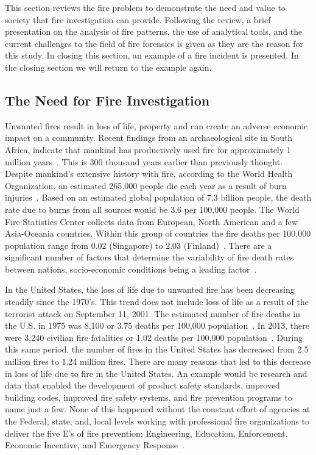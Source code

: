 \documentclass[twoside]{uocthesis}
\begin{document}
This section reviews the fire problem to demonstrate the need and value to society that fire investigation can provide. Following the review, a brief presentation on the analysis  of fire patterns, the use of analytical tools, and the current challenges to the field of fire forensics is given as they are the reason for this study.  In closing this section, an example of a fire incident is presented. In the closing section we will return to the example again.   

\subsection{The Need for Fire Investigation}
Unwanted fires result in loss of life, property and can create an adverse economic impact on a community.  Recent findings from an archaeological site in South Africa, indicate that mankind has productively used fire for approximately 1 million years~\cite{Berna:2012}.  This is 300 thousand years earlier than previously thought.  Despite mankind's extensive history with fire, according to the World Health Organization, an estimated 265,000 people die each year as a result of burn injuries~\cite{WHO:2014}.  Based on an estimated global population of 7.3 billion people, the death rate due to burns from all sources would be 3.6 per 100,000 people.  The World Fire Statistics Center collects data from European, North American and a few Asia-Oceania countries.  Within this group of countries the fire deaths per 100,000 population range from 0.02 (Singapore) to 2.03 (Finland)~\cite{Climate:2014}. There are a significant number of factors that determine the variability of fire death rates between nations, socio-economic conditions being a leading factor~\cite{WHO:2014}.

In the United States, the loss of life due to unwanted fire has been decreasing steadily since the 1970’s.  This trend does not include loss of life as a result of the terrorist attack on September 11, 2001.  The estimated number of fire deaths in the U.S. in 1975 was 8,100 or 3.75 deaths per 100,000 population~\cite{America_Burning_Revisited}.  In 2013, there were 3,240 civilian fire fatalities or 1.02 deaths per 100,000 population~\cite{Karter:2014}.  During this same period, the number of fires in the United States has decreased from 2.5 million fires to 1.24 million fires.  There are many reasons that led to this decrease in loss of life due to fire in the United States.  An example would be research and data that enabled the development of product safety standards, improved building codes, improved fire safety systems, and fire prevention programs to name just a few.  None of this happened without the constant effort of agencies at the Federal, state, and, local levels working with professional fire organizations to deliver the five E’s of fire prevention; Engineering, Education, Enforcement, Economic Incentive, and Emergency Response~\cite{FEMA:2013}.
\end{document}
